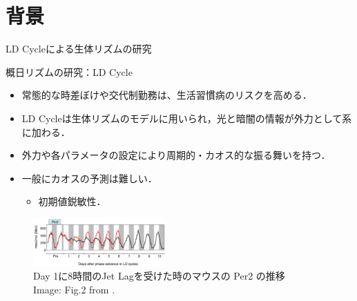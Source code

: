 \section{背景}

\begin{frame}{LD Cycleによる生体リズムの研究}
        \begin{block}{概日リズムの研究：LD Cycle}
          \begin{itemize}
            \item 常態的な時差ぼけや交代制勤務は、生活習慣病のリスクを高める．
            \item LD Cycleは生体リズムのモデルに用いられ，光と暗闇の情報が外力として系に加わる．
            \item 外力や各パラメータの設定により周期的・カオス的な振る舞いを持つ．
            \item 一般にカオスの予測は難しい．\begin{itemize}
              \item 初期値鋭敏性．
            \end{itemize}
          \end{itemize}
        \end{block}
      

      
        \begin{figure}
          \includegraphics[width=0.45\textwidth]{Fig/Jetlag.png}
          \caption{\scriptsize{Day 1に8時間のJet Lagを受けた時のマウスの Per2 の推移}\\\tiny{Image: Fig.2 from \cite{Yamaguchi et al.}.}}
      \end{figure}    
      
  \end{frame}


